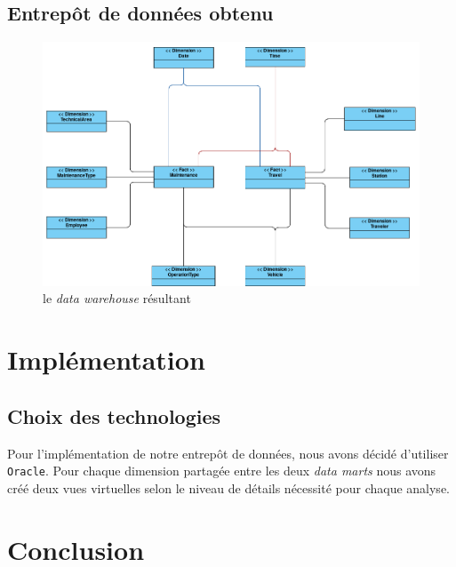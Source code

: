 \documentclass[a4paper,12pt]{report}
\begin{document}
\section{Entrepôt de données obtenu}
\begin{figure}[!ht]
  \centering
  \includegraphics[scale=0.4]{images/data_warehouse.png}
  \caption{le \textit{data warehouse} résultant}
\end{figure}

\newpage

\chapter{Implémentation}
\section{Choix des technologies}
Pour l'implémentation de notre entrepôt de données, nous avons décidé d'utiliser \texttt{Oracle}. Pour chaque dimension partagée entre les deux \textit{data marts} nous avons créé deux vues virtuelles selon le niveau de détails nécessité pour chaque analyse.

\chapter{Conclusion}
\end{document}
